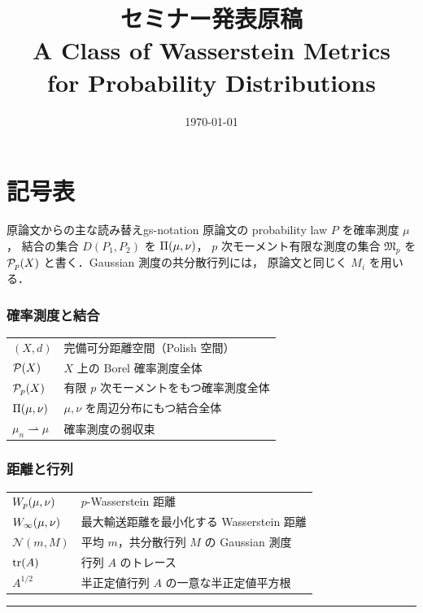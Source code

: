 \documentclass[uplatex, dvipdfmx]{jsreport}
\title{セミナー発表原稿\\{\Large A Class of Wasserstein Metrics\\for Probability Distributions}}
\author{}
\date{\today}
\begin{document}
\maketitle
\tableofcontents

\chapter*{記号表}

\begin{remark}{原論文からの主な読み替え}{gs-notation}
  原論文の probability law $P$ を確率測度 $\mu$，
  結合の集合 $D(P_1,P_2)$ を $\Pi(\mu,\nu)$，
  $p$ 次モーメント有限な測度の集合 $\mathfrak{M}_p$ を
  $\mathcal{P}_{p}(X)$ と書く．Gaussian 測度の共分散行列には，
  原論文と同じく $M_i$ を用いる．
\end{remark}

\subsection*{確率測度と結合}
\begin{tabular}{ll}
  $(X,d)$ & 完備可分距離空間（Polish 空間）\\
  $\mathcal{P}(X)$ & $X$ 上の Borel 確率測度全体 \\
  $\mathcal{P}_{p}(X)$ & 有限 $p$ 次モーメントをもつ確率測度全体 \\
  $\Pi(\mu,\nu)$ & $\mu,\nu$ を周辺分布にもつ結合全体 \\
  $\mu_n \rightharpoonup \mu$ & 確率測度の弱収束 \\
\end{tabular}

\subsection*{距離と行列}
\begin{tabular}{ll}
  $W_p(\mu, \nu)$ & $p$-Wasserstein 距離 \\
  $W_\infty(\mu,\nu)$ & 最大輸送距離を最小化する Wasserstein 距離 \\
  $\mathcal{N}(m,M)$ & 平均 $m$，共分散行列 $M$ の Gaussian 測度 \\
  $\operatorname{tr}(A)$ & 行列 $A$ のトレース \\
  $A^{1/2}$ & 半正定値行列 $A$ の一意な半正定値平方根 \\
\end{tabular}

\vspace{1em}
\hrule




\end{document}
